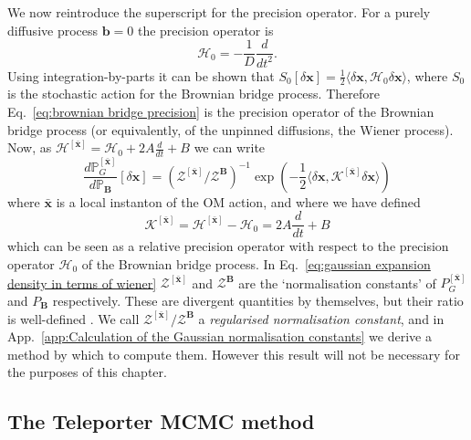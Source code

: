 We now reintroduce the superscript for the precision operator. For a purely diffusive process $\mathbf{b}=0$ the precision operator is
\begin{equation} \label{eq:brownian bridge precision}
	\mathcal{H}_0 = -\frac{1}{D} \frac{d}{d t^2}.
\end{equation}
Using integration-by-parts it can be shown that $S_0[\delta \mathbf{x}] = \frac{1}{2} \langle \delta \mathbf{x}, \mathcal{H}_0 \delta \mathbf{x} \rangle$, where $S_0$ is the stochastic action for the Brownian bridge process. Therefore Eq.~\ref{eq:brownian bridge precision} is the precision operator of the Brownian bridge process (or equivalently, of the unpinned diffusions, the Wiener process). Now, as $\mathcal{H}^{[\bar{\mathbf{x}}]} = \mathcal{H}_0 + 2 A \frac{d}{dt} + B$ we can write
\begin{equation} \label{eq:gaussian expansion density in terms of wiener}
	\frac{d \mathbb{P}_G^{[\bar{\mathbf{x}}]} }{d \mathbb{P}_\mathbf{B}}[ \delta \mathbf{x} ] = (\mathcal{Z}^{[\bar{\mathbf{x}}] } / \mathcal{Z}^\mathbf{B} )^{-1}
	\exp\left( - \frac{1}{2} \langle \delta \mathbf{x}, \mathcal{K}^{[\bar{\mathbf{x}}]} \delta \mathbf{x} \rangle  \right)
\end{equation}
where $\bar{\mathbf{x}}$ is a local instanton of the OM action, and where we have defined
\begin{equation} \label{eq:relative gaussian precision}
	\mathcal{K}^{[\bar{\mathbf{x}}]} = \mathcal{H}^{[\bar{\mathbf{x}}]} - \mathcal{H}_0 = 2A\frac{d}{dt} + B
\end{equation}
which can be seen as a relative precision operator with respect to the precision operator $\mathcal{H}_0$ of the Brownian bridge process. In Eq.~\ref{eq:gaussian expansion density in terms of wiener} $\mathcal{Z}^{[\bar{\mathbf{x}}]}$ and $\mathcal{Z}^\mathbf{B}$ are the `normalisation constants' of $P_G^{[\bar{\mathbf{x}}]}$ and $P_\mathbf{B}$ respectively. These are divergent quantities by themselves, but their ratio is well-defined \citep{gelfandIntegrationFunctionalSpaces1960}. We call $\mathcal{Z}^{[\bar{\mathbf{x}}] } / \mathcal{Z}^\mathbf{B}$ a \textit{regularised normalisation constant}, and in App.~\ref{app:Calculation of the Gaussian normalisation constants} we derive a method by which to compute them. However this result will not be necessary for the purposes of this chapter.

\subsection{The Teleporter MCMC method}

